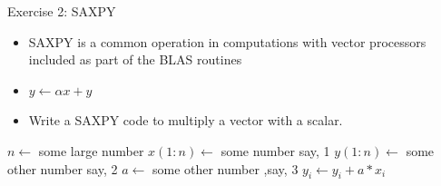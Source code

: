 \documentclass[10pt,t]{beamer}
\begin{document}
\begin{frame}{Exercise 2: SAXPY}
  \begin{itemize}
    \item SAXPY is a common operation in computations with vector processors included as part of the BLAS routines
    \item[] $y\leftarrow \alpha x + y$
    \item Write a SAXPY code to multiply a vector with a scalar.
  \end{itemize}
  \begin{algorithm}[H]
    \caption{Pseudo Code for SAXPY}
    \begin{algorithmic}
      \State $n \gets$ some large number
      \State $x(1:n) \gets$ some number say, 1
      \State $y(1:n) \gets$ some other number say, 2
      \State $a \gets$ some other number ,say, 3
      \State $y_i \gets y_i + a * x_i$
      \EndDo
    \end{algorithmic}
  \end{algorithm}
\end{frame}
\end{document}
